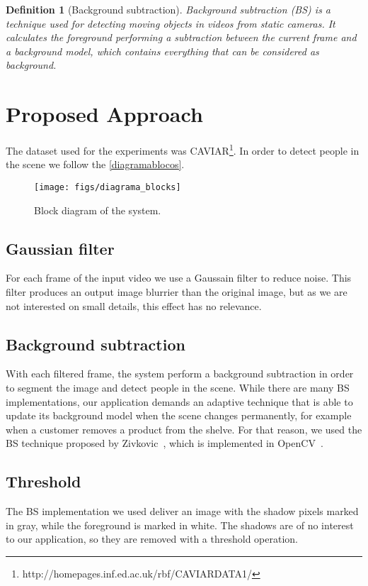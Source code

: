 \documentclass[10pt, conference]{IEEEtran}
\newtheorem{definition}{Definition}
\begin{document}
\begin{definition}[Background subtraction]
Background subtraction (BS) is a technique used for detecting moving objects in videos from static cameras. It calculates the foreground performing a subtraction between the current frame and a background model, which contains everything that can be considered as background.
\end{definition}

\section{Proposed Approach}
The dataset used for the experiments was CAVIAR\footnote{http://homepages.inf.ed.ac.uk/rbf/CAVIARDATA1/}. In order to detect people in the scene we follow the \autoref{diagramablocos}.
\begin{figure}[h]
	\centering
	\texttt{[image: figs/diagrama\_blocks]}
	\caption{Block diagram of the system.}
	\label{diagramablocos}
\end{figure}

\subsection{Gaussian filter}
	For each frame of the input video we use a Gaussain filter to reduce noise. This filter produces an output image blurrier than the original image, but as we are not interested on small details, this effect has no relevance.
\subsection{Background subtraction}
	With each filtered frame, the system perform a background subtraction in order to segment the image and detect people in the scene. While there are many BS implementations, our application demands an adaptive technique that is able to update its background model when the scene changes permanently, for example when a customer removes a product from the shelve. For that reason, we used the BS technique proposed by Zivkovic~\cite{zivkovic2004improved}, which is implemented in OpenCV~\cite{opencv_library}.
\subsection{Threshold}
	The BS implementation we used deliver an image with the shadow pixels marked in gray, while the foreground is marked in white. The shadows are of no interest to our application, so they are removed with a threshold operation.
\end{document}
